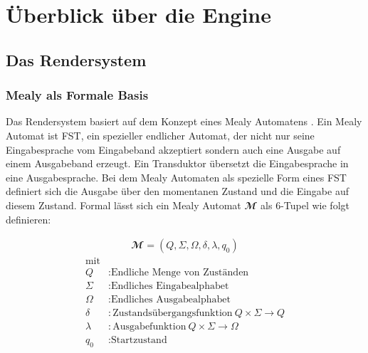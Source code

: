 \chapter{Überblick über die Engine}
\label{chap:ueberblick-pipeline}

\section{Das Rendersystem}


\subsection{Mealy als Formale Basis}

Das Rendersystem basiert auf dem Konzept eines Mealy Automatens \parencite{Mealy1955}. Ein Mealy Automat ist \ac{FST}, ein spezieller endlicher Automat, der nicht nur seine Eingabesprache vom Eingabeband akzeptiert sondern auch eine Ausgabe auf einem Ausgabeband erzeugt. Ein Transduktor übersetzt die Eingabesprache in eine Ausgabesprache. Bei dem Mealy Automaten als spezielle Form eines \ac{FST} definiert sich die Ausgabe über den momentanen Zustand und die Eingabe auf diesem Zustand. Formal lässt sich ein Mealy Automat $\mathbfcal{M}$ als 6-Tupel wie folgt definieren:

\begin{align}
\mathbfcal{M} = \left( Q, \Sigma, \Omega, \delta, \lambda, q_0 \right)
\label{def:mealy-formal}
\end{align}
\begin{align*}
	\text{mit}\\
	Q &: \text{Endliche Menge von Zuständen} \\
	\Sigma  &:\text{Endliches Eingabealphabet} \\
	\Omega  &:\text{Endliches Ausgabealphabet} \\
	\delta  &:\text{Zustandsübergangsfunktion}\ Q \times \Sigma \rightarrow Q \\
	\lambda &:\text{Ausgabefunktion}\ Q \times \Sigma \rightarrow \Omega \\
	q_0 &: \text{Startzustand}
\end{align*}

